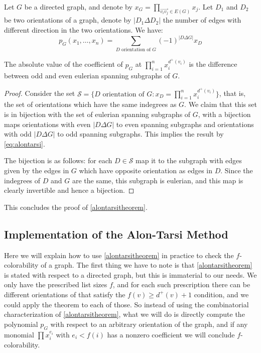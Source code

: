 \begin{observation}
Let $G$ be a directed graph, and denote by $x_G = \prod_{\overrightarrow{v_iv_j} \in E(G)} x_j$. Let $D_1$ and $D_2$ be two orientations of a graph, denote by
$|D_1 \Delta D_2|$ the number of edges with different direction in the two orientations. We have:
\begin{equation}
\label{eq:alontarsi}
p_G(x_1, \ldots, x_n) = \sum_{D \text{ orientation of } G} (-1)^{|D\Delta G|} x_D
\end{equation}
\end{observation}

\begin{proposition}
\label{proplastalontarsi}
The absolute value of the coefficient of $p_G$ at $\prod_{i=1}^n x_i^{d^+(v_i)}$ is the difference between odd and even eulerian spanning subgraphs of $G$.
\end{proposition}

\begin{proof}
Consider the set $\mathcal{S} = \{D \text{ orientation of } G : x_D = \prod_{i=1}^n x_i^{d^+(v_i)} \}$, that is, 
the set of orientations which have the same indegrees as $G$. We claim that this set is in bijection 
with the set of eulerian spanning subgraphs of $G$, with a bijection maps orientations with even 
$|D\Delta G|$ to even spanning subgraphs and orientations with odd $|D\Delta G|$ to odd spanning
subgraphs. This implies the result by \eqref{eq:alontarsi}.

The bijection is as follows: for each $D \in \mathcal{S}$ map it to the subgraph with edges given by 
the edges in $G$ which have opposite orientation as edges in $D$. Since the indegrees of $D$ and $G$ are 
the same, this subgraph is eulerian, and this map is clearly invertible and hence a bijection. 
\end{proof}

This concludes the proof of \ref{alontarsitheorem}.

\subsection{Implementation of the Alon-Tarsi Method}

Here we will explain how to use \ref{alontarsitheorem} in practice to check the $f$-colorability of a graph.  The first thing we have to note
is that \ref{alontarsitheorem} is stated with respect to a directed graph, but this is immaterial to our needs. We only have the prescribed
list sizes $f$, and for each such prescription there can be different orientations of that satisfy the $f(v) \geq d^+(v) + 1$ condition, 
and we could apply the theorem to each of those. So instead of using the combinatorial characterization of \ref{alontarsitheorem}, what we will
do is directly compute the polynomial $p_G$ with respect to an arbitrary orientation of the graph, and if any monomial $\prod x_i^{e_i}$ with 
$e_i < f(i)$ has a nonzero coefficient we will conclude $f$-colorability. 

